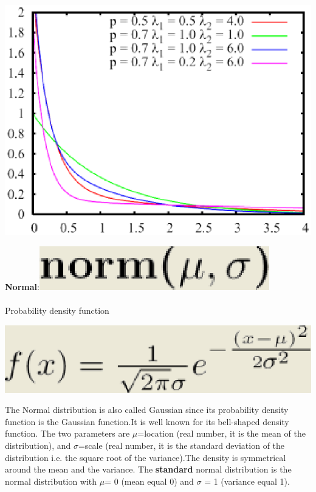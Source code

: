 \begin{center}
\includegraphics[scale=.5]{img/jsim/hyperexp_pdf.eps}
\end{center}
\textbf{Normal}:\includegraphics[scale=.5]{img/jsim/normal_f.eps}\\\\
Probability density function\\
\begin{center}
\includegraphics[scale=.5]{img/jsim/normal1.eps}
\end{center}
The Normal distribution is also called Gaussian since its probability density function is the Gaussian function.It is well known for its bell-shaped density function. The two parameters are $\mu$=location  (real number, it is the mean of the  distribution), and $\sigma$=scale (real number, it is the standard deviation of the distribution i.e. the square root of the variance).The density is symmetrical around the mean and the variance. The \textbf{standard} normal distribution is the normal distribution with $\mu$= 0 (mean equal 0) and $\sigma$ = 1 (variance equal 1).

